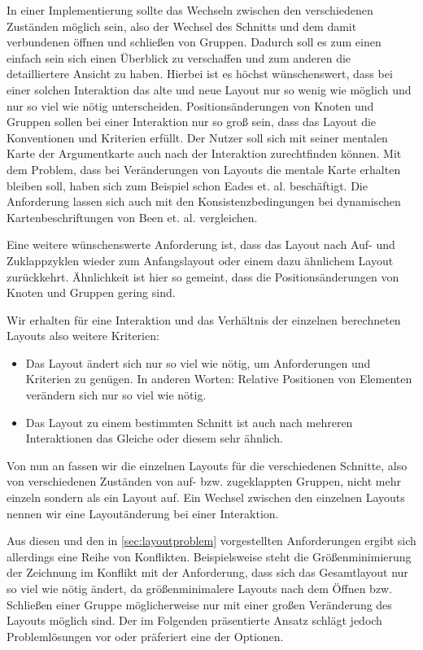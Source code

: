 In einer Implementierung sollte das Wechseln zwischen den verschiedenen Zuständen möglich sein, also der Wechsel des Schnitts und dem damit verbundenen öffnen und schließen von Gruppen. 
Dadurch soll es zum einen einfach sein sich einen Überblick zu verschaffen und zum anderen die detailliertere Ansicht zu haben.
Hierbei ist es höchst wünschenswert, dass bei einer solchen Interaktion das alte und neue Layout nur so wenig wie möglich und nur so viel wie nötig unterscheiden. 
Positionsänderungen von Knoten und Gruppen sollen bei einer Interaktion nur so groß sein, dass das Layout die Konventionen und Kriterien erfüllt.
Der Nutzer soll sich mit seiner mentalen Karte der Argumentkarte auch nach der Interaktion zurechtfinden können. 
Mit dem Problem, dass bei Veränderungen von Layouts die mentale Karte erhalten bleiben soll, haben sich zum Beispiel schon Eades et. al. \cite{eades1991preserving, Misue1995183}
beschäftigt. Die Anforderung lassen sich auch mit den Konsistenzbedingungen bei dynamischen Kartenbeschriftungen von  Been et. al. \cite{Been2010312} vergleichen.

Eine weitere wünschenswerte Anforderung ist, dass das Layout nach  Auf- und Zuklappzyklen 
wieder zum Anfangslayout oder einem dazu ähnlichem Layout zurückkehrt. 
Ähnlichkeit ist hier so gemeint, dass die Positionsänderungen von Knoten und Gruppen gering sind.

Wir erhalten für eine Interaktion und das Verhältnis der einzelnen berechneten Layouts also weitere Kriterien:
\begin{itemize}
\item Das Layout ändert sich nur so viel wie nötig, um Anforderungen und Kriterien zu genügen. In anderen Worten: Relative Positionen von Elementen verändern sich nur so viel wie nötig.
\item Das Layout zu einem bestimmten Schnitt ist auch nach mehreren Interaktionen das Gleiche oder diesem sehr ähnlich.
\end{itemize}

Von nun an fassen wir die einzelnen Layouts für die verschiedenen Schnitte, also von verschiedenen Zuständen von auf- bzw. zugeklappten Gruppen, nicht mehr einzeln
sondern als ein Layout auf. Ein Wechsel zwischen den einzelnen Layouts nennen wir eine Layoutänderung bei einer Interaktion.

Aus diesen und den in \autoref{sec:layoutproblem} vorgestellten Anforderungen ergibt sich allerdings eine Reihe von Konflikten.
Beispielsweise steht die Größenminimierung der Zeichnung im Konflikt mit der Anforderung, dass sich das Gesamtlayout nur so viel wie nötig ändert, 
da größenminimalere Layouts nach dem Öffnen bzw. Schließen einer Gruppe möglicherweise nur mit einer großen Veränderung des Layouts möglich sind.
Der im Folgenden präsentierte Ansatz schlägt jedoch Problemlösungen vor oder präferiert eine der Optionen.

